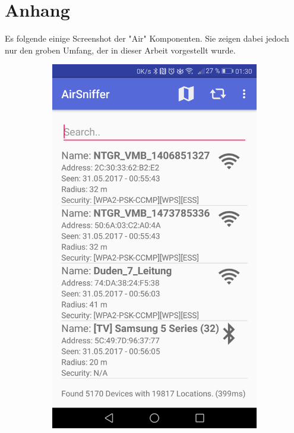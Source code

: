 \documentclass[11pt,a4paper]{article}
\begin{document}
\section{Anhang}

Es folgende einige Screenshot der "Air" Komponenten. Sie zeigen dabei jedoch nur den groben Umfang, der in dieser Arbeit vorgestellt wurde.

\begin{figure}[htbp]
    \centering
        \begin{subfigure}[htbp]{0.26\textwidth}
        \includegraphics[width=\textwidth]{pics/screenshots/AirSniffer_Home_List.png}

\end{subfigure}
\end{figure}
\end{document}
